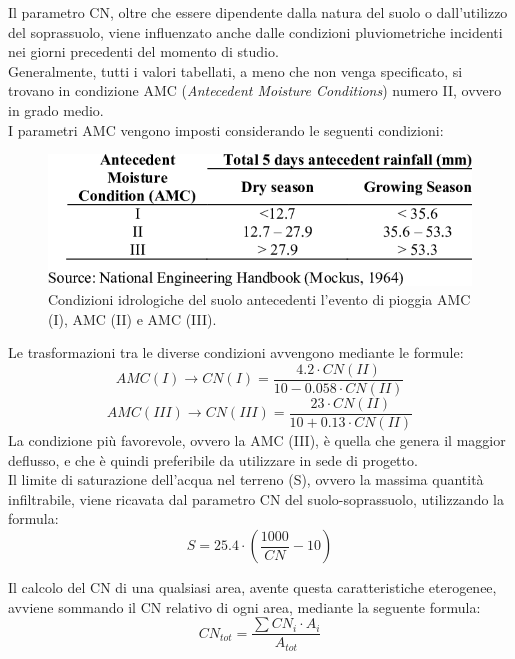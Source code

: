 Il parametro CN, oltre che essere dipendente dalla natura del suolo o dall'utilizzo del soprassuolo, viene influenzato anche dalle condizioni pluviometriche incidenti nei giorni precedenti del momento di studio.\\
Generalmente, tutti i valori tabellati, a meno che non venga specificato, si trovano in condizione AMC (\textit{Antecedent Moisture Conditions}) numero II, ovvero in grado medio.\\
I parametri AMC vengono imposti considerando le seguenti condizioni:
\begin{figure}[H]  \centering
    \includegraphics[scale=0.7]{immagini/AMC_table.png}
    \caption{Condizioni idrologiche del suolo antecedenti l'evento di pioggia AMC (I), AMC (II) e AMC (III).}
    \label{AMC_table}
\end{figure}
Le trasformazioni tra le diverse condizioni avvengono mediante le formule:
\begin{equation}
    AMC (I)\rightarrow CN (I) = \frac{4.2 \cdot CN(II)}{10-0.058 \cdot CN(II)}
\end{equation}
\begin{equation}
    AMC(III) \rightarrow CN(III) = \frac{23\cdot CN (II)}{10+0.13 \cdot CN(II)}
    \label{amcIII}
\end{equation}
La condizione più favorevole, ovvero la AMC (III), è quella che genera il maggior deflusso, e che è quindi preferibile da utilizzare in sede di progetto.\\
Il limite di saturazione dell'acqua nel terreno (S), ovvero la massima quantità infiltrabile, viene ricavata dal parametro CN del suolo-soprassuolo, utilizzando la formula:
\begin{equation}
    S = 25.4 \cdot \left(\frac{1000}{CN} -10 \right)
    \label{parametro_S}
\end{equation} 

Il calcolo del CN di una qualsiasi area, avente questa caratteristiche eterogenee, avviene sommando il CN relativo di ogni area, mediante la seguente formula:
\begin{equation}
    CN_{tot}=\frac{\sum CN_i \cdot A_i}{A_{tot}}
\end{equation}

